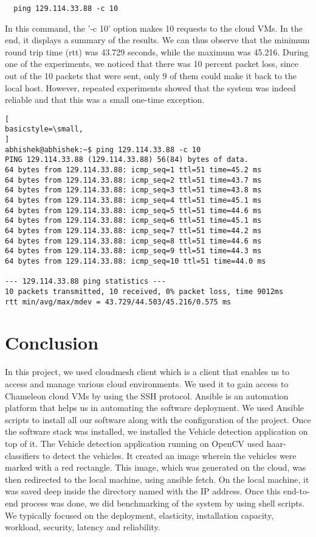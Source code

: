 \documentclass[9pt,twocolumn,twoside]{../../styles/osajnl}
\begin{document}
\begin{lstlisting}
  ping 129.114.33.88 -c 10
\end{lstlisting}
	
In this command, the '-c 10' option makes 10 requests to the cloud
VMs.  In the end, it displays a summary of the results.  We can thus
observe that the minimum round trip time (rtt) was 43.729 seconds,
while the maximum was 45.216.  During one of the experiments, we noticed
that there was 10 percent packet loss, since out of the 10 packets
that were sent, only 9 of them could make it back to the local host.
However, repeated experiments showed that the system was indeed
reliable and that this was a small one-time exception.  

\begin{lstlisting}[
basicstyle=\small,
]
abhishek@abhishek:~$ ping 129.114.33.88 -c 10
PING 129.114.33.88 (129.114.33.88) 56(84) bytes of data.
64 bytes from 129.114.33.88: icmp_seq=1 ttl=51 time=45.2 ms
64 bytes from 129.114.33.88: icmp_seq=2 ttl=51 time=43.7 ms
64 bytes from 129.114.33.88: icmp_seq=3 ttl=51 time=43.8 ms
64 bytes from 129.114.33.88: icmp_seq=4 ttl=51 time=45.1 ms
64 bytes from 129.114.33.88: icmp_seq=5 ttl=51 time=44.6 ms
64 bytes from 129.114.33.88: icmp_seq=6 ttl=51 time=45.1 ms
64 bytes from 129.114.33.88: icmp_seq=7 ttl=51 time=44.2 ms
64 bytes from 129.114.33.88: icmp_seq=8 ttl=51 time=44.6 ms
64 bytes from 129.114.33.88: icmp_seq=9 ttl=51 time=44.3 ms
64 bytes from 129.114.33.88: icmp_seq=10 ttl=51 time=44.0 ms

--- 129.114.33.88 ping statistics ---
10 packets transmitted, 10 received, 0% packet loss, time 9012ms
rtt min/avg/max/mdev = 43.729/44.503/45.216/0.575 ms
\end{lstlisting}


\section{Conclusion}
In this project, we used cloudmesh client which is a client that
enables us to access and manage various cloud environments.  We used
it to gain access to Chameleon cloud VMs by using the SSH protocol.
Ansible is an automation platform that helps us in automating the
software deployment.  We used Ansible scripts to install all our
software along with the configuration of the project.  Once the
software stack was installed, we installed the Vehicle detection
application on top of it.  The Vehicle detection application running
on OpenCV used haar-classifiers to detect the vehicles.  It created an
image wherein the vehicles were marked with a red rectangle.  This
image, which was generated on the cloud, was then redirected to the
local machine, using ansible fetch.  On the local machine, it was
saved deep inside the directory named with the IP address.  Once this
end-to-end process was done, we did benchmarking of the system by
using shell scripts.  We typically focused on the deployment,
elasticity, installation capacity, workload, security, latency and
reliability.
\end{document}

